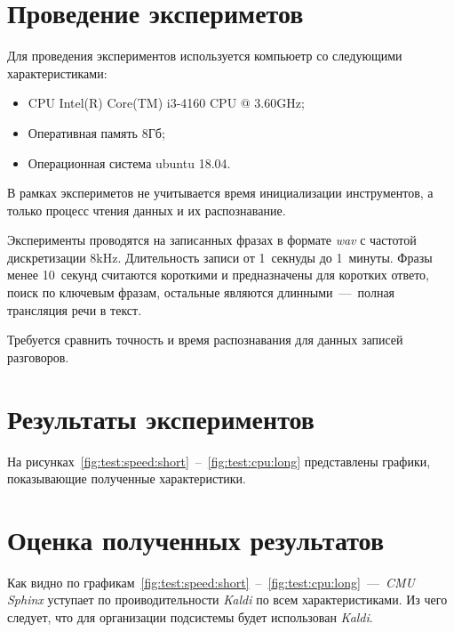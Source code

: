 


\section{Проведение экспериметов}
Для проведения экспериментов используется компьюетр со следующими характеристиками:
\begin{itemize}
    \item CPU Intel(R) Core(TM) i3-4160 CPU @ 3.60GHz;
    \item Оперативная память 8Гб;
    \item Операционная система ubuntu 18.04.
\end{itemize}

В рамках экспериметов не учитывается время инициализации инструментов, а только
процесс чтения данных и их распознавание.

Эксперименты проводятся на записанных фразах в формате \textit{wav} с частотой
дискретизации 8kHz. Длительность записи от 1~секнуды до 1~минуты.
Фразы менее 10~секунд считаются короткими и предназначены для коротких ответо,
поиск по ключевым фразам, остальные являются длинными~---~полная трансляция речи
в текст.

Требуется сравнить точность и время распознавания для данных записей разговоров.
\section{Результаты экспериментов}
На рисунках~\ref{fig:test:speed:short}~--~\ref{fig:test:cpu:long} представлены
графики, показывающие полученные характеристики.


\section{Оценка полученных результатов}

Как видно по графикам~\ref{fig:test:speed:short}~--~\ref{fig:test:cpu:long}~---~\textit{CMU Sphinx}
уступает по проиводительности \textit{Kaldi} по всем характеристиками.
Из чего следует, что для организации подсистемы будет использован \textit{Kaldi}.

